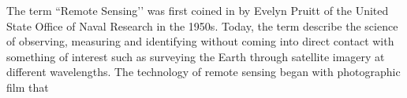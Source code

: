 
The term ``Remote Sensing’’ was first coined in by Evelyn Pruitt of the United State Office of Naval Research in the 1950s. Today, the term describe the science of observing, measuring and identifying without coming into direct contact with something of interest such as surveying the Earth through satellite imagery at different wavelengths. The technology of remote sensing began with photographic film that 